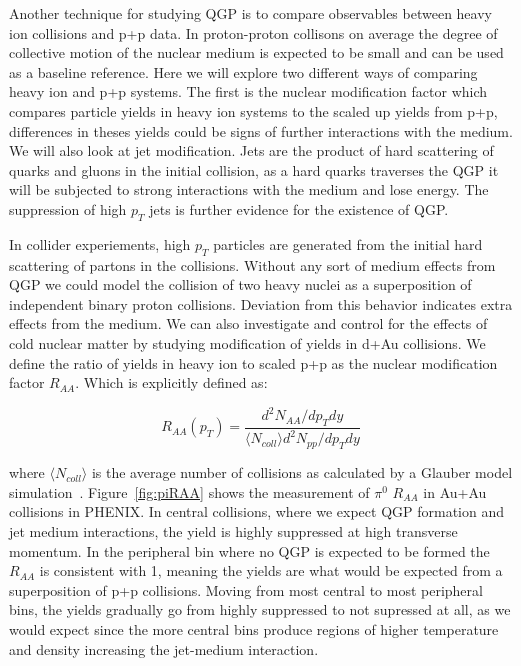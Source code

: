 Another technique for studying QGP is to compare observables between heavy ion collisions and p+p data. In proton-proton collisons on average the degree of collective motion of the nuclear medium is expected to be small and can be used as a baseline reference. Here we will explore two different ways of comparing heavy ion and p+p systems. The first is the nuclear modification factor which compares particle yields in  heavy ion systems to the scaled up yields from p+p, differences in theses yields could be signs of further interactions with the medium. We will also look at jet modification. Jets are the product of hard scattering of quarks and gluons in the initial collision, as a hard quarks traverses the QGP it will be subjected to strong interactions with the medium and lose energy. The suppression of high $p_T$ jets is further evidence for the existence of QGP.

In collider experiements, high $p_T$ particles are generated from the initial hard scattering of partons in the collisions. Without any sort of medium effects from QGP we could model the collision of two heavy nuclei as a superposition of independent binary proton collisions. Deviation from this behavior indicates extra effects from the medium. We can also investigate and control for the effects of cold nuclear matter by studying modification of yields in d+Au collisions. We define the ratio of yields in heavy ion to scaled p+p as the nuclear modification factor $R_{AA}$. Which is explicitly defined as:

\begin{equation}\label{eq:RAAdef}
R_{AA}(p_T) = \frac{d^2N_{AA}/dp_Tdy}{\langle N_{coll} \rangle d^2N_{pp}/dp_Tdy} 
\end{equation}

where $ \langle N_{coll} \rangle $ is the average number of collisions as calculated by a Glauber model simulation~\cite{glaub}. Figure~\ref{fig:piRAA} shows the measurement of $\pi^0$ $ R_{AA}$ in Au+Au collisions in PHENIX. In central collisions, where we expect QGP formation and jet medium interactions, the yield is highly suppressed at high transverse momentum. In the peripheral bin where no QGP is expected to be formed the $R_{AA}$ is consistent with 1, meaning the yields are what would be expected from a superposition of p+p collisions. Moving from most central to most peripheral bins, the yields gradually go from highly suppressed to not supressed at all, as we would expect since the more central bins produce regions of higher temperature and density increasing the jet-medium interaction.

